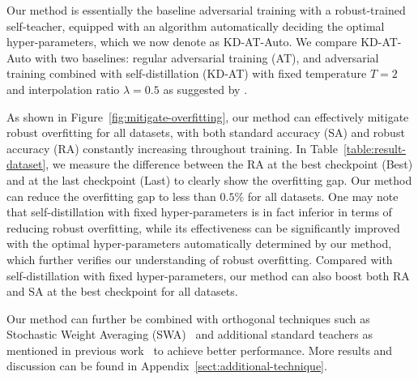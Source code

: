 Our method is essentially the baseline adversarial training with a robust-trained self-teacher, equipped with an algorithm automatically deciding the optimal hyper-parameters, which we now denote as KD-AT-Auto.
We compare KD-AT-Auto with two baselines: regular adversarial training (AT), and adversarial training combined with self-distillation (KD-AT) with fixed temperature $T=2$ and interpolation ratio $\lambda=0.5$ as suggested by \citet{chen2021robust}. 

As shown in Figure~\ref{fig:mitigate-overfitting}, our method can effectively mitigate robust overfitting for all datasets, with both standard accuracy (SA) and robust accuracy (RA) constantly increasing throughout training. In Table~\ref{table:result-dataset}, we measure the difference between the RA at the best checkpoint (Best) and at the last checkpoint (Last) to clearly show the overfitting gap. Our method can reduce the overfitting gap to less than $0.5\%$ for all datasets. One may note that self-distillation with fixed hyper-parameters is in fact inferior in terms of reducing robust overfitting, while its effectiveness can be significantly improved with the optimal hyper-parameters automatically determined by our method, which further verifies our understanding of robust overfitting. 
Compared with self-distillation with fixed hyper-parameters, our method can also boost both RA and SA at the best checkpoint for all datasets.


Our method can further be combined with orthogonal techniques such as Stochastic Weight Averaging (SWA)~\citep{Izmailov2018AveragingWL} and additional standard teachers as mentioned in previous work~\citep{chen2021robust} to achieve better performance. More results and discussion can be found in Appendix~\ref{sect:additional-technique}.




    
